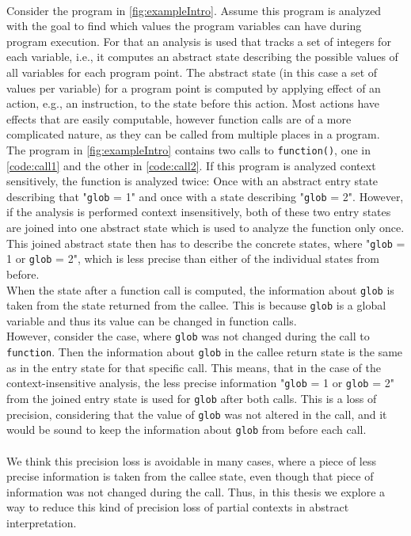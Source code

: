   \\
  Consider the program in \autoref{fig:exampleIntro}. Assume this program is analyzed with the goal to find which values the program variables can have during program execution. For that an analysis is used that tracks a set of integers for each variable, i.e., it computes an abstract state describing the possible values of all variables for each program point. The abstract state (in this case a set of values per variable) for a program point is computed by applying effect of an action, e.g., an instruction, to the state before this action. Most actions have effects that are easily computable, however function calls are of a more complicated nature, as they can be called from multiple places in a program.\\
  The program in \autoref{fig:exampleIntro} contains two calls to \texttt{function()}, one in \autoref{code:call1} and the other in \autoref{code:call2}. If this program is analyzed context sensitively, the function is analyzed twice: Once with an abstract entry state describing that "\texttt{glob} = 1" and once with a state describing "\texttt{glob} = 2". However, if the analysis is performed context insensitively, both of these two entry states are joined into one abstract state which is used to analyze the function only once. This joined abstract state then has to describe the concrete states, where "\texttt{glob} = 1 or \texttt{glob} = 2", which is less precise than either of the individual states from before.\\
  When the state after a function call is computed, the information about \texttt{glob} is taken from the state returned from the callee. This is because \texttt{glob} is a global variable and thus its value can be changed in function calls.\\
  However, consider the case, where \texttt{glob} was not changed during the call to \texttt{function}. Then the information about \texttt{glob} in the callee return state is the same as in the entry state for that specific call. This means, that in the case of the context-insensitive analysis, the less precise information "\texttt{glob} = 1 or \texttt{glob} = 2" from the joined entry state is used for \texttt{glob} after both calls. This is a loss of precision, considering that the value of \texttt{glob} was not altered in the call, and it would be sound to keep the information about \texttt{glob} from before each call.\\
  \\
  We think this precision loss is avoidable in many cases, where a piece of less precise information is taken from the callee state, even though that piece of information was not changed during the call. Thus, in this thesis we explore a way to reduce this kind of precision loss of partial contexts in abstract interpretation. 

